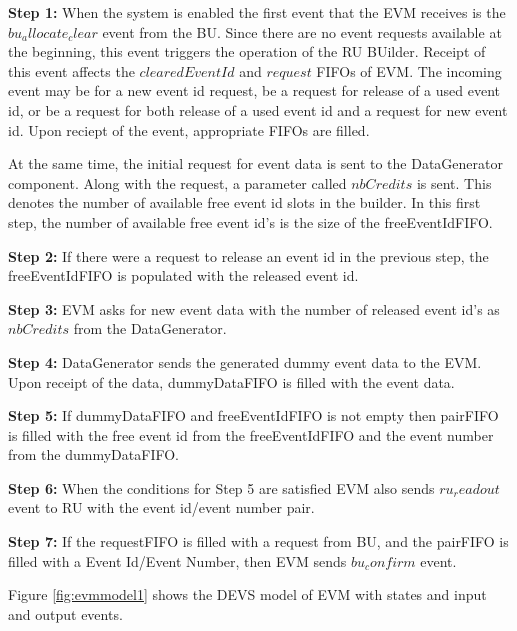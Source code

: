 \textbf{Step 1:} When the system is enabled the first event that the EVM receives is the $bu_allocate_clear$ event from the BU. Since there are no event requests available at the beginning, this event triggers the operation of the RU BUilder. Receipt of this event affects the $clearedEventId$ and $request$ FIFOs of EVM. The incoming event may be for a new event id request, be a request for release of a used event id, or be a request for both release of a used event id and a request for new event id. Upon reciept of the event, appropriate FIFOs are filled.

At the same time, the initial request for event data is sent to the DataGenerator component. Along with the request, a parameter called $nbCredits$ is sent. This denotes the number of available free event id slots in the builder. In this first step, the number of available free event id's is the size of the freeEventIdFIFO. 

\textbf{Step 2:} If there were a request to release an event id in the previous step, the freeEventIdFIFO is populated with the released event id.

\textbf{Step 3:} EVM asks for new event data with the number of released event id's as $nbCredits$ from the DataGenerator.

\textbf{Step 4:} DataGenerator sends the generated dummy event data to the EVM. Upon receipt of the data, dummyDataFIFO is filled with the event data. 

\textbf{Step 5:} If dummyDataFIFO and freeEventIdFIFO is not empty then pairFIFO is filled with the free event id from the freeEventIdFIFO and the event number from the dummyDataFIFO.

\textbf{Step 6:} When the conditions for Step 5 are satisfied EVM also sends $ru_readout$ event to RU with the event id/event number pair. 

\textbf{Step 7:} If the requestFIFO is filled with a request from BU, and the pairFIFO is filled with a Event Id/Event Number, then EVM sends $bu_confirm$ event.

Figure \ref{fig:evmmodel1} shows the DEVS model of EVM with states and input and output events.

